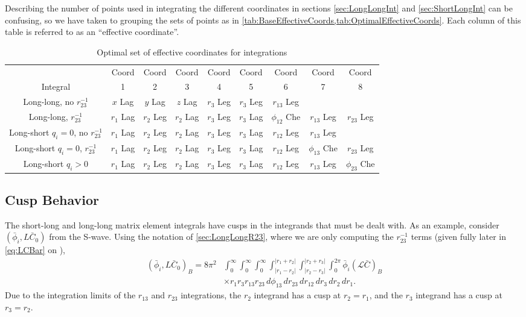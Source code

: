 \documentclass[Dissertation.tex]{subfiles}
\begin{document}
Describing the number of points used in integrating the different coordinates 
in sections \ref{sec:LongLongInt} and \ref{sec:ShortLongInt} can be 
confusing, so we have taken to grouping the sets of points as in
\cref{tab:BaseEffectiveCoords,tab:OptimalEffectiveCoords}. Each column of 
this table is referred to as an ``effective coordinate''.

\begin{table}[H]
\centering
\footnotesize
\begin{tabular}{c c c c c c c c c}
\toprule
 & Coord & Coord & Coord & Coord & Coord & Coord & Coord & Coord \\
Integral & 1 & 2 & 3 & 4 & 5 & 6 & 7 & 8 \\
\midrule
 Long-long, no $r_{23}^{-1}$ & $x$ Lag & $y$ Lag & $z$ Lag & $r_3$ Leg & $r_3$ Leg & $r_{13}$ Leg & & \\
 Long-long, $r_{23}^{-1}$ & $r_1$ Lag & $r_2$ Leg & $r_2$ Lag & $r_3$ Leg & $r_3$ Lag & $\phi_{12}$ Che & $r_{13}$ Leg & $r_{23}$ Leg \\
\midrule
 Long-short $q_i = 0$, no $r_{23}^{-1}$ & $r_1$ Lag & $r_2$ Leg & $r_2$ Lag & $r_3$ Leg & $r_3$ Lag & $r_{12}$ Leg & $r_{13}$ Leg & \\
 Long-short $q_i = 0$, $r_{23}^{-1}$ & $r_1$ Lag & $r_2$ Leg & $r_2$ Lag & $r_3$ Leg & $r_3$ Lag & $r_{12}$ Leg & $\phi_{13}$ Che & $r_{23}$ Leg \\
 Long-short $q_i > 0$ & $r_1$ Lag & $r_2$ Leg & $r_2$ Lag & $r_3$ Leg & $r_3$ Lag & $r_{12}$ Leg & $r_{13}$ Leg & $\phi_{23}$ Che \\
\bottomrule
\end{tabular}
\caption{Optimal set of effective coordinates for integrations}
\label{tab:EffectiveCoords}
\end{table}


\subsection{Cusp Behavior}
\label{sec:Cusps}

The short-long and long-long matrix element integrals have cusps in the
integrands that must be dealt with. As an example, consider
$(\bar{\phi}_i, L\bar{C}_0)$ from the S-wave. Using the notation of
\cref{sec:LongLongR23}, where we are only computing the $r_{23}^{-1}$ terms
(given fully later in \cref{eq:LCBar} on \pageref{eq:LCBar}),
\begin{align}
(\bar{\phi}_i, L\bar{C}_0)_B = 8\pi^2 & \int_0^\infty \int_0^\infty \int_0^\infty \int_{|r_1 - r_2|}^{|r_1 + r_2|} \int_{|r_2 - r_3|}^{|r_2 + r_3|} \int_0^{2\pi} \bar{\phi}_i (\mathcal{L} \bar{C})_B  \nonumber \\
& \times r_1 r_3 r_{13} r_{23}\, d\phi_{13}\, dr_{23}\, dr_{12}\, dr_3\, dr_2\, dr_1.
\end{align}
Due to the integration limits of the $r_{13}$ and $r_{23}$ integrations, the
$r_2$ integrand has a cusp at $r_2 = r_1$, and the $r_3$ integrand has a cusp
at $r_3 = r_2$.
\end{document}
